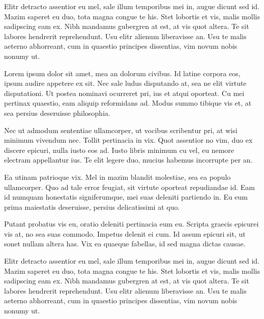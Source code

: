 \documentclass[twoside, 12pt, dvipdfmx]{article}
\begin{document}
    Elitr detracto assentior eu mel, sale illum temporibus mei in, augue dicunt sed id. Mazim saperet eu duo, 
    tota magna congue te his. Stet lobortis et vis, malis mollis sadipscing eam ex. Nibh mandamus gubergren at est, 
    at vis quot altera. Te sit labores hendrerit reprehendunt. Usu elitr alienum liberavisse an. Usu te malis aeterno 
    abhorreant, cum in quaestio principes dissentias, vim novum nobis nonumy ut.

    Lorem ipsum dolor sit amet, mea an dolorum civibus. Id latine corpora eos, ipsum audire appetere ex sit. 
    Nec sale ludus disputando at, sea ne elit virtute disputationi. Ut postea nominavi ocurreret pri, ius et atqui oporteat. 
    Cu mei pertinax quaestio, eam aliquip reformidans ad. Modus summo tibique vis et, at sea persius deseruisse philosophia.

    Nec ut admodum sententiae ullamcorper, ut vocibus scribentur pri, at wisi minimum vivendum nec. Tollit pertinacia in vix. 
    Quot assentior no vim, duo ex discere epicuri, nulla iusto eos ad. Iusto libris minimum cu vel, eu nemore electram appellantur ius. 
    Te elit legere duo, mucius habemus incorrupte per an.

    Ea utinam patrioque vix. Mel in mazim blandit molestiae, sea ea populo ullamcorper. Quo ad tale error feugiat, 
    sit virtute oporteat repudiandae id. Eam id numquam honestatis signiferumque, mei suas deleniti partiendo in. 
    Eu eum prima maiestatis deseruisse, persius delicatissimi at quo.

    Putant probatus vis eu, oratio deleniti pertinacia eum eu. Scripta graecis epicurei vis at, no sea suas commodo. 
    Impetus delenit ei cum. Id assum epicuri sit, ut sonet nullam altera has. Vix ea quaeque fabellas, id sed magna dictas causae.

    Elitr detracto assentior eu mel, sale illum temporibus mei in, augue dicunt sed id. Mazim saperet eu duo, 
    tota magna congue te his. Stet lobortis et vis, malis mollis sadipscing eam ex. Nibh mandamus gubergren at est, 
    at vis quot altera. Te sit labores hendrerit reprehendunt. Usu elitr alienum liberavisse an. Usu te malis aeterno 
    abhorreant, cum in quaestio principes dissentias, vim novum nobis nonumy ut.
    
\end{document}
